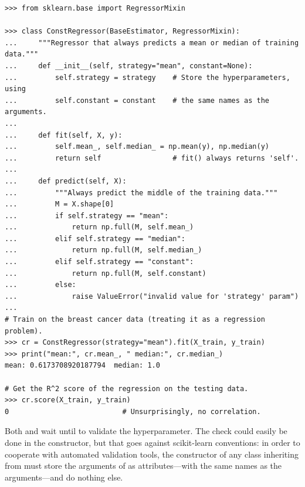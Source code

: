 \begin{lstlisting}
>>> from sklearn.base import RegressorMixin

>>> class ConstRegressor(BaseEstimator, RegressorMixin):
...     """Regressor that always predicts a mean or median of training data."""
...     def __init__(self, strategy="mean", constant=None):
...         self.strategy = strategy    # Store the hyperparameters, using
...         self.constant = constant    # the same names as the arguments.
...
...     def fit(self, X, y):
...         self.mean_, self.median_ = np.mean(y), np.median(y)
...         return self                 # fit() always returns 'self'.
...
...     def predict(self, X):
...         """Always predict the middle of the training data."""
...         M = X.shape[0]
...         if self.strategy == "mean":
...             return np.full(M, self.mean_)
...         elif self.strategy == "median":
...             return np.full(M, self.median_)
...         elif self.strategy == "constant":
...             return np.full(M, self.constant)
...         else:
...             raise ValueError("invalid value for 'strategy' param")
...
# Train on the breast cancer data (treating it as a regression problem).
>>> cr = ConstRegressor(strategy="mean").fit(X_train, y_train)
>>> print("mean:", cr.mean_, " median:", cr.median_)
mean: 0.6173708920187794  median: 1.0

# Get the R^2 score of the regression on the testing data.
>>> cr.score(X_train, y_train)
0                           # Unsurprisingly, no correlation.
\end{lstlisting}

\begin{warn}
Both  and  wait until  to validate the  hyperparameter.
The check could easily be done in the constructor, but that goes against scikit-learn conventions: in order to cooperate with automated validation tools, the constructor of any class inheriting from  must store the arguments of  as attributes---with the same names as the arguments---and do nothing else.
\end{warn}

\newpage


